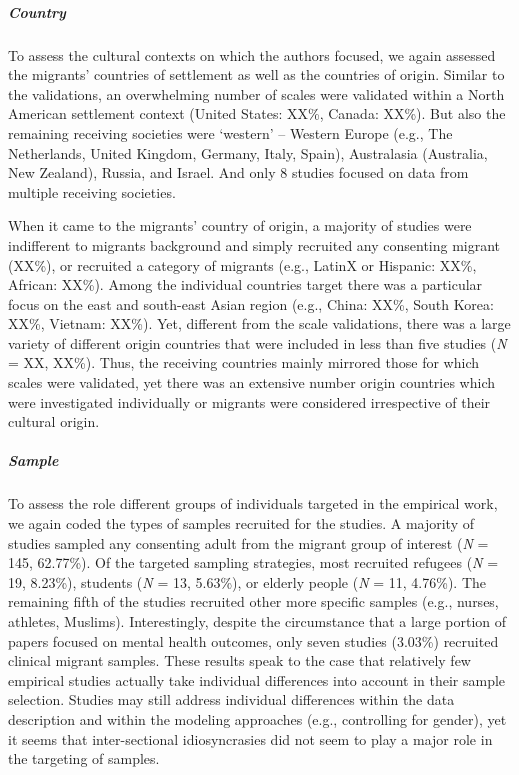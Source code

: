 \documentclass[man, 12pt, a4paper]{apa7}
\begin{document}
\subparagraph{Country}
To assess the cultural contexts on which the authors focused, we again assessed the migrants' countries of settlement as well as the countries of origin. Similar to the validations, an overwhelming number of scales were validated within a North American settlement context (United States: XX\%, Canada: XX\%). But also the remaining receiving societies were `western' -- Western Europe (e.g., The Netherlands, United Kingdom, Germany, Italy, Spain), Australasia (Australia, New Zealand), Russia, and Israel. And only 8 studies focused on data from multiple receiving societies. 

When it came to the migrants' country of origin, a majority of studies were indifferent to migrants background and simply recruited any consenting migrant (XX\%), or recruited a category of migrants (e.g., LatinX or Hispanic: XX\%, African: XX\%). Among the individual countries target there was a particular focus on the east and south-east Asian region (e.g., China: XX\%, South Korea: XX\%, Vietnam: XX\%). Yet, different from the scale validations, there was a large variety of different origin countries that were included in less than five studies (\textit{N} = XX, XX\%). Thus, the receiving countries mainly mirrored those for which scales were validated, yet there was an extensive number origin countries which were investigated individually or migrants were considered irrespective of their cultural origin.

\subparagraph{Sample}
To assess the role different groups of individuals targeted in the empirical work, we again coded the types of samples recruited for the studies. A majority of studies sampled any consenting adult from the migrant group of interest (\textit{N} = 145, 62.77\%). Of the targeted sampling strategies, most recruited refugees (\textit{N} = 19, 8.23\%), students (\textit{N} = 13, 5.63\%), or elderly people (\textit{N} = 11, 4.76\%). The remaining fifth of the studies recruited other more specific samples (e.g., nurses, athletes, Muslims). Interestingly, despite the circumstance that a large portion of papers focused on mental health outcomes, only seven studies (3.03\%) recruited clinical migrant samples. These results speak to the case that relatively few empirical studies actually take individual differences into account in their sample selection. Studies may still address individual differences within the data description and within the modeling approaches (e.g., controlling for gender), yet it seems that inter-sectional idiosyncrasies did not seem to play a major role in the targeting of samples.
\end{document}
